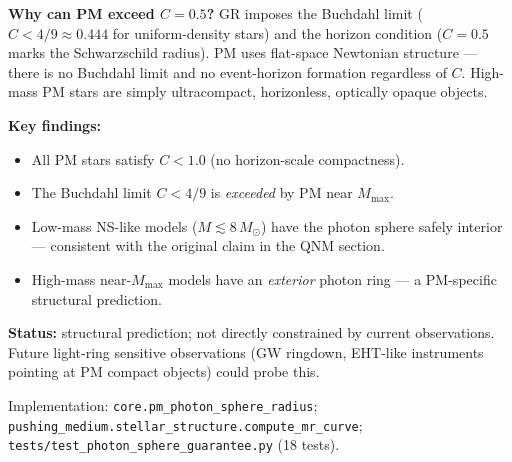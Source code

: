 \documentclass[10pt,twocolumn]{article}
\begin{document}
\begin{center}
\renewcommand{\arraystretch}{1.2}
\end{center}

\noindent\textbf{Why can PM exceed $C = 0.5$?}
GR imposes the Buchdahl limit ($C < 4/9 \approx 0.444$ for uniform-density stars) and
the horizon condition ($C = 0.5$ marks the Schwarzschild radius).
PM uses flat-space Newtonian structure — there is no Buchdahl limit and no
event-horizon formation regardless of $C$.  High-mass PM stars are simply
ultracompact, horizonless, optically opaque objects.

\noindent\textbf{Key findings:}
\begin{itemize}
  \item All PM stars satisfy $C < 1.0$ (no horizon-scale compactness).
  \item The Buchdahl limit $C < 4/9$ is \emph{exceeded} by PM near $M_{\max}$.
  \item Low-mass NS-like models ($M \lesssim 8\,M_\odot$) have the photon sphere
        safely interior — consistent with the original claim in the QNM section.
  \item High-mass near-$M_{\max}$ models have an \emph{exterior} photon ring —
        a PM-specific structural prediction.
\end{itemize}

\noindent\textbf{Status:} structural prediction; not directly constrained by
current observations.  Future light-ring sensitive observations
(GW ringdown, EHT-like instruments pointing at PM compact objects) could
probe this.

Implementation: \texttt{core.pm\_photon\_sphere\_radius};
\texttt{pushing\_medium.stellar\_structure.compute\_mr\_curve};
\texttt{tests/test\_photon\_sphere\_guarantee.py} (18 tests).
\end{document}
